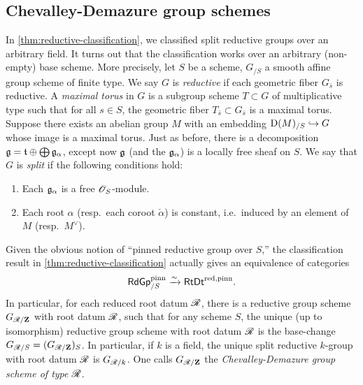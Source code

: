 \subsection{Chevalley-Demazure group schemes}

In \autoref{thm:reductive-classification}, we classified split reductive 
groups over an arbitrary field. It turns out that the classification works over 
an arbitrary (non-empty) base scheme. More precisely, let $S$ be a scheme, 
$G_{/S}$ a smooth affine group scheme of finite type. We say $G$ is 
\emph{reductive} if each geometric fiber $G_{\bar s}$ is reductive. A 
\emph{maximal torus} in $G$ is a subgroup scheme $T\subset G$ of multiplicative 
type such that for all $s\in S$, the geometric fiber 
$T_{\bar s}\subset G_{\bar s}$ is a maximal torus. Suppose there exists an 
abelian group $M$ with an embedding $\operatorname{D}(M)_{/S}\hookrightarrow G$ whose image is a 
maximal torus. Just as before, there is a decomposition 
$\mathfrak{g}=\mathfrak{t}\oplus \bigoplus \mathfrak{g}_\alpha$, except now $\mathfrak{g}$ (and the $\mathfrak{g}_\alpha$) 
is a locally free sheaf on $S$. We say that $G$ is \emph{split} if the 
following conditions hold: 
\begin{enumerate}
  \item Each $\mathfrak{g}_\alpha$ is a free $\mathscr{O}_S$-module. 
  \item Each root $\alpha$ (resp.~each coroot $\check\alpha$) is constant, 
    i.e.~induced by an element of $M$ (resp.~$M^\vee$). 
\end{enumerate}
Given the obvious notion of 
``pinned reductive group over $S$,'' the classification result in 
\autoref{thm:reductive-classification} actually gives an equivalence of 
categories 
\[
  \mathsf{RdGp}_{/S}^\mathrm{pinn} \xrightarrow\sim \mathsf{RtDt}^\mathrm{red,pinn} .
\]
In particular, for each reduced root datum $\mathscr{R}$, there is a reductive group 
scheme $G_{\mathscr{R}/\mathbf{Z}}$ with root datum $\mathscr{R}$, such that for any scheme $S$, the 
unique (up to isomorphism) reductive group scheme with root datum $\mathscr{R}$ is the 
base-change $G_{\mathscr{R}/S} = (G_{\mathscr{R}/\mathbf{Z}})_S$. In particular, if $k$ is a field, 
the unique split reductive $k$-group with root datum $\mathscr{R}$ is 
$G_{\mathscr{R}/k}$. One calls $G_{\mathscr{R}/\mathbf{Z}}$ the \emph{Chevalley-Demazure group scheme 
of type $\mathscr{R}$}. 




